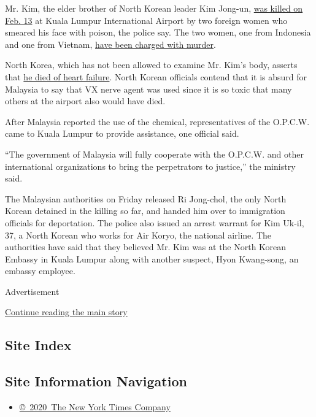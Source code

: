 Mr. Kim, the elder brother of North Korean leader Kim Jong-un,
\href{https://www.nytimes.com/2017/02/22/world/asia/kim-jong-nam-assassination-korea-malaysia.html}{was
killed on Feb. 13} at Kuala Lumpur International Airport by two foreign
women who smeared his face with poison, the police say. The two women,
one from Indonesia and one from Vietnam,
\href{https://www.nytimes.com/2017/02/28/world/asia/north-korea-kim-jong-nam-death.html}{have
been charged with murder}.

North Korea, which has not been allowed to examine Mr. Kim's body,
asserts that
\href{https://www.nytimes.com/2017/03/01/world/asia/kim-jong-nam-assassination-north-korea-visa-malaysia.html}{he
died of heart failure}. North Korean officials contend that it is absurd
for Malaysia to say that VX nerve agent was used since it is so toxic
that many others at the airport also would have died.

After Malaysia reported the use of the chemical, representatives of the
O.P.C.W. came to Kuala Lumpur to provide assistance, one official said.

``The government of Malaysia will fully cooperate with the O.P.C.W. and
other international organizations to bring the perpetrators to
justice,'' the ministry said.

The Malaysian authorities on Friday released Ri Jong-chol, the only
North Korean detained in the killing so far, and handed him over to
immigration officials for deportation. The police also issued an arrest
warrant for Kim Uk-il, 37, a North Korean who works for Air Koryo, the
national airline. The authorities have said that they believed Mr. Kim
was at the North Korean Embassy in Kuala Lumpur along with another
suspect, Hyon Kwang-song, an embassy employee.

Advertisement

\protect\hyperlink{after-bottom}{Continue reading the main story}

\hypertarget{site-index}{%
\subsection{Site Index}\label{site-index}}

\hypertarget{site-information-navigation}{%
\subsection{Site Information
Navigation}\label{site-information-navigation}}

\begin{itemize}
\tightlist
\item
  \href{https://help.nytimes.com/hc/en-us/articles/115014792127-Copyright-notice}{©~2020~The
  New York Times Company}
\end{itemize}

